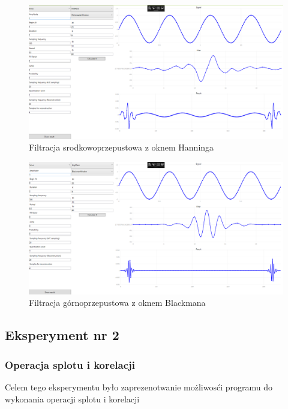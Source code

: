 \documentclass[12pt]{article}
\begin{document}
\begin{figure}[H]
 \centering
 \includegraphics[width=14cm]{images/midrect.PNG}
 \vspace{-0.3cm}
 \caption{Filtracja srodkowoprzepustowa z oknem Hanninga}
 \label{gui}
\end{figure}
\begin{figure}[H]
 \centering
 \includegraphics[width=14cm]{images/highblack.PNG}
 \vspace{-0.3cm}
 \caption{Filtracja górnoprzepustowa z oknem Blackmana}
 \label{gui}
\end{figure}


\subsection{Eksperyment nr 2 }
\subsubsection{Operacja splotu i korelacji}
Celem tego eksperymentu było zaprezenotwanie możliwosći programu do wykonania operacji splotu i korelacji
\end{document}
